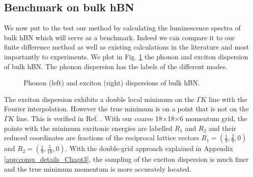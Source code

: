 \subsection{Benchmark on bulk hBN} \label{sec:bulk_hBN}
We now put to the test our method by calculating the luminescence spectra of bulk hBN which will serve as a benchmark. Indeed we can compare it to our finite difference method as well as existing calculations in the literature and most importantly to experiments. We plot in Fig. \ref{fig:ph_exc_disp_hBN} the phonon and exciton dispersion of bulk \acrlong{hBN}. The phonon dispersion has the labels of the different modes.
\begin{figure}[h!t]%
	\vspace{0.2cm}
	\setcapindent{2em}
	\centering
    \caption{Phonon (left) and exciton (right) dispersions of bulk \acrshort{hBN}.}
    \label{fig:ph_exc_disp_hBN} %
\end{figure}
The exciton dispersion exhibits a double local minimum on the $\Gamma K$ line with the Fourier interpolation. However the true minimum is on a point that is not on the $\Gamma K$ line. This is verified in Ref. \cite{zanfrognini2023distinguishing}.
With our coarse 18$\times$18$\times$6 momentum grid, the points with the minimum excitonic energies are labelled $R_1$ and $R_2$ and their reduced coordinates are fractions of the reciprocal lattice vectors $R_1=(\tfrac{1}{9},\tfrac{2}{9},0)$ and $R_2=(\tfrac{1}{9},\tfrac{5}{18},0)$. With the double-grid approach explained in Appendix \ref{app:comp_details_Chapt3}, the sampling of the exciton dispersion is much finer and the true minimum momentum is more accurately located.

